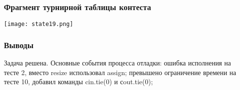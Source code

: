 \documentclass[12pt]{article}
\begin{document}
\subsubsection*{Фрагмент турнирной таблицы контеста}
\begin{center}
\texttt{[image: state19.png]}\newline\noindent
\end{center}

\subsubsection*{Выводы}
Задача решена. Основные события процесса отладки: ошибка исполнения на тесте 2, вместо resize использовал assign; превышено ограничение времени на тесте 10, добавил команды cin.tie(0) и сout.tie(0);
\end{document}
